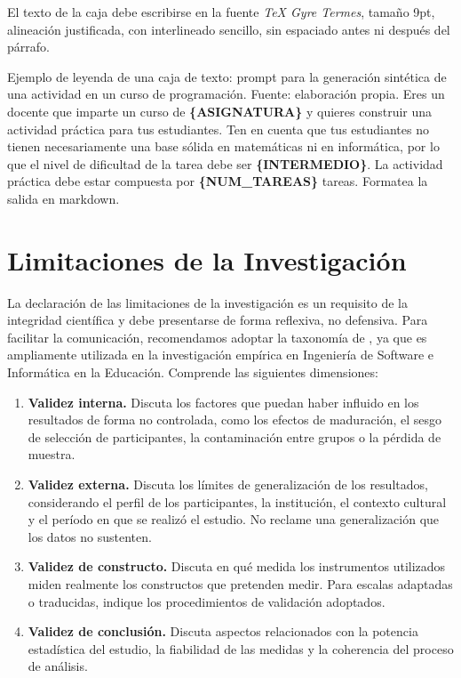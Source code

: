 \documentclass[spanish]{rbie2026}%
\begin{document}
El texto de la caja debe escribirse en la fuente \textit{TeX Gyre Termes}, tamaño 9pt, alineación justificada, con interlineado sencillo, sin espaciado antes ni después del párrafo.


\begin{inputbox}{Ejemplo de leyenda de una caja de texto: prompt para la generación sintética de una actividad en un curso de programación. Fuente: elaboración propia. \label{inputbox:prompt}}
    Eres un docente que imparte un curso de \textbf{\textcolor{variablecolor}{\{ASIGNATURA\}}} y quieres construir una actividad práctica para tus estudiantes. Ten en cuenta que tus estudiantes no tienen necesariamente una base sólida en matemáticas ni en informática, por lo que el nivel de dificultad de la tarea debe ser \textbf{\textcolor{variablecolor}{\{INTERMEDIO\}}}. La actividad práctica debe estar compuesta por \textbf{\textcolor{variablecolor}{\{NUM\_TAREAS\}}} tareas. Formatea la salida en markdown.
\end{inputbox}



\section{Limitaciones de la Investigación}
\label{sec:limitations}

La declaración de las limitaciones de la investigación es un requisito de la integridad científica y debe presentarse de forma reflexiva, no defensiva. Para facilitar la comunicación, recomendamos adoptar la taxonomía de \cite{Wohlin2012}, ya que es ampliamente utilizada en la investigación empírica en Ingeniería de Software e Informática en la Educación. Comprende las siguientes dimensiones:

\begin{enumerate}
  \item \textbf{Validez interna.} Discuta los factores que puedan haber influido en los resultados de forma no controlada, como los efectos de maduración, el sesgo de selección de participantes, la contaminación entre grupos o la pérdida de muestra.

  \item \textbf{Validez externa.} Discuta los límites de generalización de los resultados, considerando el perfil de los participantes, la institución, el contexto cultural y el período en que se realizó el estudio. No reclame una generalización que los datos no sustenten.

  \item \textbf{Validez de constructo.} Discuta en qué medida los instrumentos utilizados miden realmente los constructos que pretenden medir. Para escalas adaptadas o traducidas, indique los procedimientos de validación adoptados.

  \item \textbf{Validez de conclusión.} Discuta aspectos relacionados con la potencia estadística del estudio, la fiabilidad de las medidas y la coherencia del proceso de análisis.
\end{enumerate}
\end{document}
